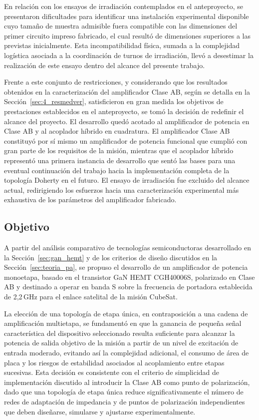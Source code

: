 En relación con los ensayos de irradiación contemplados en el anteproyecto, se presentaron dificultades para identificar una instalación experimental disponible cuyo tamaño de muestra admisible fuera compatible con las dimensiones del primer circuito impreso fabricado, el cual resultó de dimensiones superiores a las previstas inicialmente. Esta incompatibilidad física, sumada a la complejidad logística asociada a la coordinación de turnos de irradiación, llevó a desestimar la realización de este ensayo dentro del alcance del presente trabajo.

Frente a este conjunto de restricciones, y considerando que los resultados obtenidos en la caracterización del amplificador Clase AB, según se detalla en la Sección~\ref{sec:4_resmedver}, satisficieron en gran medida los objetivos de prestaciones establecidos en el anteproyecto, se tomó la decisión de redefinir el alcance del proyecto. El desarrollo quedó acotado al amplificador de potencia en Clase AB y al acoplador híbrido en cuadratura. El amplificador Clase AB constituyó por sí mismo un amplificador de potencia funcional que cumplió con gran parte de los requisitos de la misión, mientras que el acoplador híbrido representó una primera instancia de desarrollo que sentó las bases para una eventual continuación del trabajo hacia la implementación completa de la topología Doherty en el futuro. El ensayo de irradiación fue excluido del alcance actual, redirigiendo los esfuerzos hacia una caracterización experimental más exhaustiva de los parámetros del amplificador fabricado.

\subsection{Objetivo}
A partir del análisis comparativo de tecnologías semiconductoras desarrollado en la Sección~\ref{sec:gan_hemt} y de los criterios de diseño discutidos en la Sección~\ref{sec:teoria_pa}, se propuso el desarrollo de un amplificador de potencia monoetapa, basado en el transistor GaN HEMT CGH40006S, polarizado en Clase AB y destinado a operar en banda S sobre la frecuencia de portadora establecida de 2,2\,GHz para el enlace satelital de la misión CubeSat.

La elección de una topología de etapa única, en contraposición a una cadena de amplificación multietapa, se fundamentó en que la ganancia de pequeña señal característica del dispositivo seleccionado resulta suficiente para alcanzar la potencia de salida objetivo de la misión a partir de un nivel de excitación de entrada moderado, evitando así la complejidad adicional, el consumo de área de placa y los riesgos de estabilidad asociados al acoplamiento entre etapas sucesivas. Esta decisión es consistente con el criterio de simplicidad de implementación discutido al introducir la Clase AB como punto de polarización, dado que una topología de etapa única reduce significativamente el número de redes de adaptación de impedancia y de puntos de polarización independientes que deben diseñarse, simularse y ajustarse experimentalmente.

